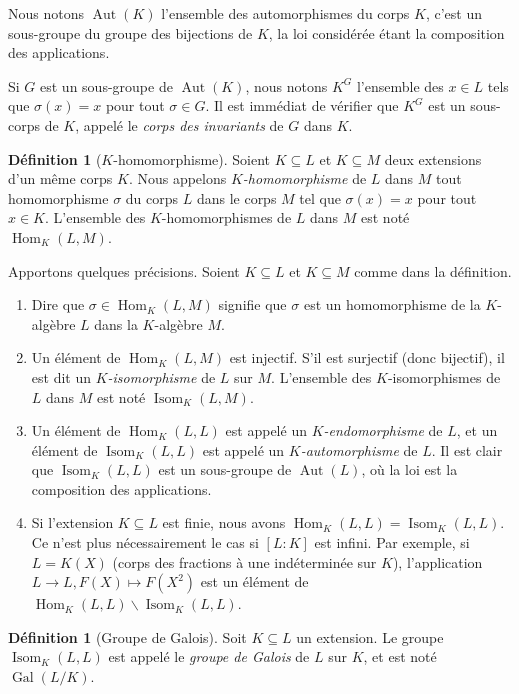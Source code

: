 \documentclass[a4paper, titlepage]{article}
\theoremstyle{definition}
\newtheorem{defi}[theo]{Définition}
\theoremstyle{remark}
\def\aut{\operatorname{Aut}}
\def\hom{\operatorname{Hom}}
\def\isom{\operatorname{Isom}}
\def\gal{\operatorname{Gal}}
\begin{document}
Nous notons $\aut(K)$ l'ensemble des automorphismes du corps $K$, c'est un sous-groupe du groupe des bijections de $K$, la loi considérée étant la composition des applications.

Si $G$ est un sous-groupe de $\aut(K)$, nous notons $K^G$ l'ensemble des $x \in L$ tels que $\sigma(x) = x$ pour tout $\sigma \in G$. Il est immédiat de vérifier que $K^G$ est un sous-corps de $K$, appelé le \textit{corps des invariants} de $G$ dans $K$.

\begin{defi}[$K$-homomorphisme]
Soient $K \subseteq L$ et $K \subseteq M$ deux extensions d'un même corps $K$. Nous appelons \textit{$K$-homomorphisme} de $L$ dans $M$ tout homomorphisme $\sigma$ du corps $L$ dans le corps $M$ tel que $\sigma(x) = x$ pour tout $x \in K$. L'ensemble des $K$-homomorphismes de $L$ dans $M$ est noté $\hom_K(L,M)$.
\end{defi}

Apportons quelques précisions. Soient $K \subseteq L$ et $K \subseteq M$ comme dans la définition. \begin{enumerate}
\item Dire que $\sigma \in \hom_K(L,M)$ signifie que $\sigma$ est un homomorphisme de la $K$-algèbre $L$ dans la $K$-algèbre $M$.
\item Un élément de $\hom_K(L,M)$ est injectif. S'il est surjectif (donc bijectif), il est dit un \textit{$K$-isomorphisme} de $L$ sur $M$. L'ensemble des $K$-isomorphismes de $L$ dans $M$ est noté $\isom_K(L,M)$.
\item Un élément de $\hom_K(L,L)$ est appelé un \textit{$K$-endomorphisme} de $L$, et un élément de $\isom_K(L,L)$ est appelé un \textit{$K$-automorphisme} de $L$. Il est clair que $\isom_K(L,L)$ est un sous-groupe de $\aut(L)$, où la loi est la composition des applications.
\item Si l'extension $K \subseteq L$ est finie, nous avons $\hom_K(L,L) = \isom_K(L,L)$. Ce n'est plus nécessairement le cas si $[L:K]$ est infini. Par exemple, si $L = K(X)$ (corps des fractions à une indéterminée sur $K$), l'application $L \rightarrow L, F(X) \mapsto F(X^2)$ est un élément de $\hom_K(L,L) \backslash \isom_K(L,L)$.
\end{enumerate}

\begin{defi}[Groupe de Galois]
Soit $K \subseteq L$ un extension. Le groupe $\isom_K(L,L)$ est appelé le \textit{groupe de Galois} de $L$ sur $K$, et est noté $\gal(L/K)$.
\end{defi}
\end{document}
